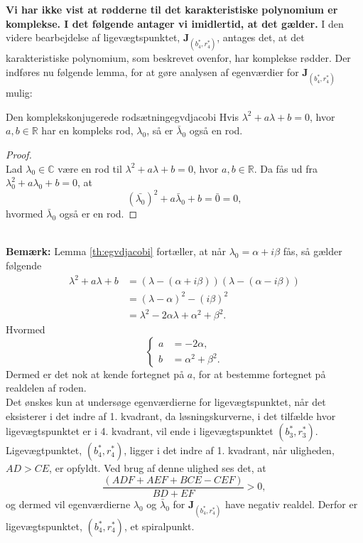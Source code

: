 \textbf{Vi har ikke vist at rødderne til det karakteristiske polynomium er komplekse. I det følgende antager vi imidlertid, at det gælder.}
I den videre bearbejdelse af ligevægtspunktet, $\textbf{J}_{(b^*_4, r^*_4)}$, antages det, at det karakteristiske polynomium, som beskrevet ovenfor, har komplekse rødder. Der indføres nu følgende lemma, for at gøre analysen af egenværdier for $\textbf{J}_{(b^*_4, r^*_4)}$ mulig:
\begin{lemma}{Den komplekskonjugerede rodsætning}{egvdjacobi}
Hvis $\lambda^2 + a \lambda +b=0$, hvor $a, b \in \mathbb{R}$ har en kompleks rod, $\lambda_0$, så er $\bar{\lambda}_0$ også en rod.
\end{lemma}

\begin{proof}\\
Lad $\lambda_0 \in \mathbb{C}$ være en rod til $\lambda^2 +a \lambda +b = 0$, hvor $a, b \in \mathbb{R}$. Da fås ud fra $\lambda_0^2 +a \lambda_0 +b = 0$, at
$$(\bar{\lambda_0})^2 +a \bar{\lambda}_0 +b = \bar{0}=0,$$
hvormed $\bar{\lambda}_0$ også er en rod.
\end{proof}
\\ \hfill \break
\textbf{Bemærk:} Lemma \ref{th:egvdjacobi} fortæller, at når $\lambda_0 = \alpha + i \beta$ fås, så gælder følgende
\begin{align*}
    \lambda^2 +a\lambda +b &= (\lambda-(\alpha +i \beta))(\lambda - (\alpha - i \beta)) \\
    &= (\lambda - \alpha)^2 -(i \beta)^2 \\
    &= \lambda^2-2 \alpha \lambda + \alpha^2 + \beta^2.
\end{align*}
Hvormed
\begin{equation*}
\begin{cases}
    a &= -2 \alpha, \\
    b &= \alpha^2 + \beta^2.
\end{cases}
\end{equation*}
Dermed er det nok at kende fortegnet på $a$, for at bestemme fortegnet på realdelen af roden.\\ \hfill \break
Det ønskes kun at undersøge egenværdierne for ligevægtspunktet, når det eksisterer i det indre af 1. kvadrant, da løsningskurverne, i det tilfælde hvor ligevægtspunktet er i 4. kvadrant, vil ende i ligevægtspunktet $(b^*_3, r^*_3)$. Ligevægtpunktet, $(b^*_4, r^*_4)$, ligger i det indre af 1. kvadrant, når uligheden, $AD > CE$, er opfyldt. Ved brug af denne ulighed ses det, at
$$\frac{(ADF+AEF+BCE-CEF)}{BD+EF} > 0,$$
og dermed vil egenværdierne $\lambda_0$ og $\bar{\lambda}_0$ for
$\textbf{J}_{(b^*_4, r^*_4)}$ have negativ realdel. Derfor er ligevægtspunktet, $(b^*_4, r^*_4)$, et spiralpunkt.
\hfill \break

